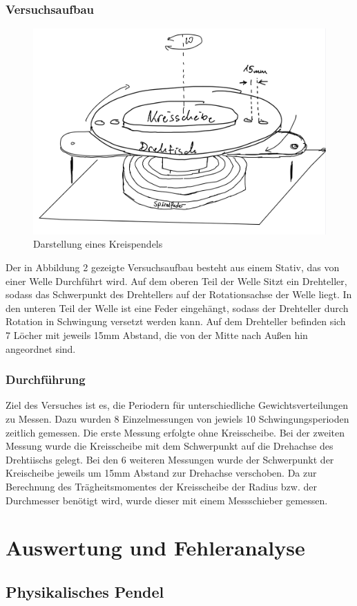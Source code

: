 \documentclass[11pt,a4paper]{article}
\begin{document}
     \subsubsection{Versuchsaufbau}
     \begin{figure}[H]
     	\includegraphics[width=0.6\linewidth]{Drehpendel.png}
     	\centering
     	\caption{Darstellung eines Kreispendels \text{[2]}}
     \end{figure}
 Der in Abbildung 2 gezeigte Versuchsaufbau besteht aus einem Stativ, das von einer Welle Durchführt wird. Auf dem oberen Teil der Welle Sitzt ein Drehteller, sodass das Schwerpunkt des Drehtellers auf der Rotationsachse der Welle liegt. In den unteren Teil der Welle ist eine Feder eingehängt, sodass der Drehteller durch Rotation in Schwingung versetzt werden kann. Auf dem Drehteller befinden sich 7 Löcher mit jeweils 15mm Abstand, die von der Mitte nach Außen hin angeordnet sind.
     \subsubsection{Durchführung}
Ziel des Versuches ist es, die Periodern für unterschiedliche Gewichtsverteilungen zu Messen. Dazu wurden 8 Einzelmessungen von jewiels 10 Schwingungsperioden zeitlich gemessen.
Die erste Messung erfolgte ohne Kreisscheibe. Bei der zweiten Messung wurde die Kreisscheibe mit dem Schwerpunkt auf die Drehachse des Drehtiischs gelegt. Bei den 6 weiteren Messungen wurde der Schwerpunkt der Kreischeibe jeweils um 15mm Abstand zur Drehachse verschoben.
Da zur Berechnung des Trägheitsmomentes der Kreisscheibe der Radius bzw. der Durchmesser benötigt wird, wurde dieser mit einem Messschieber gemessen.
\section{Auswertung und Fehleranalyse}
	\subsection{Physikalisches Pendel}
\end{document}

